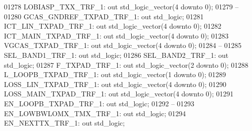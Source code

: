 \begin{DoxyCode}
01278         LOBIASP\_TXX\_TRF\_1:  \textcolor{keywordflow}{out} \textcolor{comment}{std\_logic\_vector}(\textcolor{vhdllogic}{}\textcolor{vhdllogic}{4} \textcolor{keywordflow}{downto} \textcolor{vhdllogic}{}\textcolor{vhdllogic}{0});
01279 \textcolor{keyword}{        --}
01280         GCAS\_GNDREF\_TXPAD\_TRF\_1:    \textcolor{keywordflow}{out} \textcolor{comment}{std\_logic};
01281         ICT\_LIN\_TXPAD\_TRF\_1:    \textcolor{keywordflow}{out} \textcolor{comment}{std\_logic\_vector}(\textcolor{vhdllogic}{}\textcolor{vhdllogic}{4} \textcolor{keywordflow}{downto} \textcolor{vhdllogic}{}\textcolor{vhdllogic}{0});
01282         ICT\_MAIN\_TXPAD\_TRF\_1:   \textcolor{keywordflow}{out} \textcolor{comment}{std\_logic\_vector}(\textcolor{vhdllogic}{}\textcolor{vhdllogic}{4} \textcolor{keywordflow}{downto} \textcolor{vhdllogic}{}\textcolor{vhdllogic}{0});
01283         VGCAS\_TXPAD\_TRF\_1:  \textcolor{keywordflow}{out} \textcolor{comment}{std\_logic\_vector}(\textcolor{vhdllogic}{}\textcolor{vhdllogic}{4} \textcolor{keywordflow}{downto} \textcolor{vhdllogic}{}\textcolor{vhdllogic}{0});
01284 \textcolor{keyword}{        --}
01285         SEL\_BAND1\_TRF\_1:    \textcolor{keywordflow}{out} \textcolor{comment}{std\_logic};
01286         SEL\_BAND2\_TRF\_1:    \textcolor{keywordflow}{out} \textcolor{comment}{std\_logic};
01287         F\_TXPAD\_TRF\_1:      \textcolor{keywordflow}{out} \textcolor{comment}{std\_logic\_vector}(\textcolor{vhdllogic}{}\textcolor{vhdllogic}{2} \textcolor{keywordflow}{downto} \textcolor{vhdllogic}{}\textcolor{vhdllogic}{0});
01288         L\_LOOPB\_TXPAD\_TRF\_1:    \textcolor{keywordflow}{out} \textcolor{comment}{std\_logic\_vector}(\textcolor{vhdllogic}{}\textcolor{vhdllogic}{1} \textcolor{keywordflow}{downto} \textcolor{vhdllogic}{}\textcolor{vhdllogic}{0});
01289         LOSS\_LIN\_TXPAD\_TRF\_1:   \textcolor{keywordflow}{out} \textcolor{comment}{std\_logic\_vector}(\textcolor{vhdllogic}{}\textcolor{vhdllogic}{4} \textcolor{keywordflow}{downto} \textcolor{vhdllogic}{}\textcolor{vhdllogic}{0});
01290         LOSS\_MAIN\_TXPAD\_TRF\_1:  \textcolor{keywordflow}{out} \textcolor{comment}{std\_logic\_vector}(\textcolor{vhdllogic}{}\textcolor{vhdllogic}{4} \textcolor{keywordflow}{downto} \textcolor{vhdllogic}{}\textcolor{vhdllogic}{0});
01291         EN\_LOOPB\_TXPAD\_TRF\_1:   \textcolor{keywordflow}{out} \textcolor{comment}{std\_logic};
01292 \textcolor{keyword}{        --}
01293         EN\_LOWBWLOMX\_TMX\_TRF\_1: \textcolor{keywordflow}{out} \textcolor{comment}{std\_logic};
01294         EN\_NEXTTX\_TRF\_1:    \textcolor{keywordflow}{out} \textcolor{comment}{std\_logic};

\end{DoxyCode}
